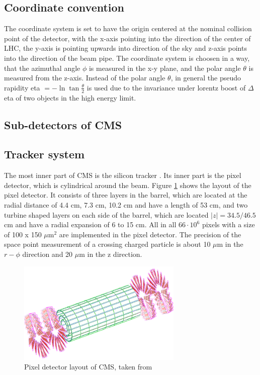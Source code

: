 \subsection{Coordinate convention}

The coordinate system is set to have the origin centered at the nominal collision point of the detector, with the x-axis pointing into the direction of the center of \gls{LHC}, the y-axis is pointing upwards into direction of the sky and z-axis points into the direction of the beam pipe. The coordinate system is choosen in a way, that the azimuthal angle $\phi$ is measured in the x-y plane, and the polar angle $\theta$ is measured from the z-axis. Instead of the polar angle $\theta$, in general the pseudo rapidity \gls{eta} $= -\ln{\tan{\frac{\theta}{2}}}$ is used due to the invariance under lorentz boost of $\Delta$\gls{eta} of two objects in the high energy limit.


\subsection{Sub-detectors of \gls{CMS}}
\label{sec:section_2_2_2}

\subsection*{Tracker system}

The most inner part of \gls{CMS} is the silicon tracker \cite{CMS2, CMSTRACKER}. Its inner part is the pixel detector, which is cylindrical around the beam. Figure \ref{fig:fig_2_6} shows the layout of the pixel detector. It consists of three layers in the barrel, which are located at the radial distance of 4.4 cm, 7.3 cm, 10.2 cm and have a length of 53 cm, and two turbine shaped layers on each side of the barrel, which are located $|z| = 34.5/46.5$ cm and have a radial expansion of 6 to 15 cm. All in all $66\cdot 10^{6}$ pixels with a size of 100 x 150 $\mu$m$^{2}$ are implemented in the pixel detector. The precision of the space point measurement of a crossing charged particle is about 10 $\mu$m in the $r-\phi$ direction and 20 $\mu$m in the z direction. \\

\begin{figure}[ht]
	\centering
	\includegraphics[width=0.7\textwidth]{pictures/CMS_tracker.pdf}

	\caption[Pixel detector layout of CMS]{Pixel detector layout of CMS, taken from \cite{CMS2}}
	\label{fig:fig_2_6}
\end{figure}


